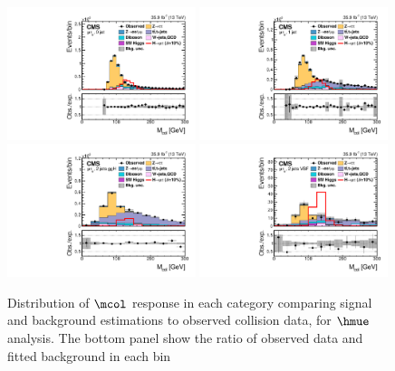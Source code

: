 \begin{figure}[!htpb]\centering
 \includegraphics[width=0.49\textwidth]{plots_and_figures/chapter8/h125/0jetmcol.pdf}
 \includegraphics[width=0.49\textwidth]{plots_and_figures/chapter8/h125/1jetmcol.pdf} \\
 \includegraphics[width=0.49\textwidth]{plots_and_figures/chapter8/h125/2jetggmcol.pdf}
 \includegraphics[width=0.49\textwidth]{plots_and_figures/chapter8/h125/2jetvbmcol.pdf} 
\caption{Distribution of $\mcol$ response in each category comparing signal and background estimations to observed collision data, for $\hmue$ analysis. The bottom panel show the ratio of observed data and fitted background in each bin~\cite{HIG-17-001}}
 \label{fig:mcol_dist_hmue}
\end{figure}

